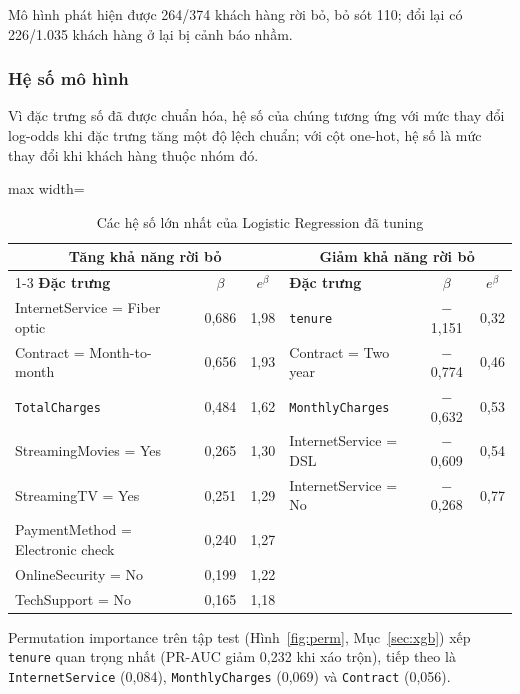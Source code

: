 Mô hình phát hiện được 264/374 khách hàng rời bỏ, bỏ sót 110; đổi lại có 226/1.035 khách hàng ở lại bị cảnh báo nhầm.

\subsubsection{Hệ số mô hình}
Vì đặc trưng số đã được chuẩn hóa, hệ số của chúng tương ứng với mức thay đổi log-odds khi đặc trưng tăng một độ lệch chuẩn; với cột one-hot, hệ số là mức thay đổi khi khách hàng thuộc nhóm đó.

\begin{table}[H]
\centering
\small
\begin{adjustbox}{max width=\textwidth}
\begin{tabular}{|l|c|c|l|c|c|}
\hline
\multicolumn{3}{|c|}{\textbf{Tăng khả năng rời bỏ}} & \multicolumn{3}{c|}{\textbf{Giảm khả năng rời bỏ}} \\
\cline{1-3} \cline{4-6}
\textbf{Đặc trưng} & $\beta$ & $e^{\beta}$ & \textbf{Đặc trưng} & $\beta$ & $e^{\beta}$ \\
\hline
InternetService = Fiber optic & 0,686 & 1,98 & \texttt{tenure} & $-$1,151 & 0,32 \\
\hline
Contract = Month-to-month & 0,656 & 1,93 & Contract = Two year & $-$0,774 & 0,46 \\
\hline
\texttt{TotalCharges} & 0,484 & 1,62 & \texttt{MonthlyCharges} & $-$0,632 & 0,53 \\
\hline
StreamingMovies = Yes & 0,265 & 1,30 & InternetService = DSL & $-$0,609 & 0,54 \\
\hline
StreamingTV = Yes & 0,251 & 1,29 & InternetService = No & $-$0,268 & 0,77 \\
\hline
PaymentMethod = Electronic check & 0,240 & 1,27 & & & \\
\hline
OnlineSecurity = No & 0,199 & 1,22 & & & \\
\hline
TechSupport = No & 0,165 & 1,18 & & & \\
\hline
\end{tabular}
\end{adjustbox}
\caption{Các hệ số lớn nhất của Logistic Regression đã tuning}
\end{table}

Permutation importance trên tập test (Hình~\ref{fig:perm}, Mục~\ref{sec:xgb}) xếp \texttt{tenure} quan trọng nhất (PR-AUC giảm 0,232 khi xáo trộn), tiếp theo là \texttt{InternetService} (0,084), \texttt{MonthlyCharges} (0,069) và \texttt{Contract} (0,056).


